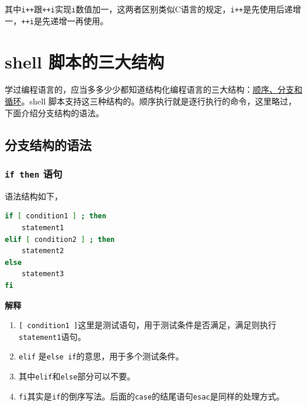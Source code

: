 \documentclass[doctor,openright,twoside]{sjtuthesis}
\providecommand{\tightlist}{%
    \setlength{\itemsep}{0pt}\setlength{\parskip}{0pt}}
\newcommand{\passthrough}[1]{#1}
\theoremstyle{plain}
\theoremstyle{definition}
\theoremstyle{remark}
\theoremstyle{ocrenumbox}
\theoremstyle{plain}
\begin{document}
其中\passthrough{\lstinline!i++!}跟\passthrough{\lstinline!++i!}实现\passthrough{\lstinline!i!}数值加一，这两者区别类似C语言的规定，\passthrough{\lstinline!i++!}是先使用后递增一，\passthrough{\lstinline!++i!}是先递增一再使用。

\hypertarget{shell--4}{%
\section{shell 脚本的三大结构}\label{shell--4}}

学过编程语言的，应当多多少少都知道结构化编程语言的三大结构：\href{https://en.wikipedia.org/wiki/Structured_programming}{顺序、分支和循环}。shell 脚本支持这三种结构的。顺序执行就是逐行执行的命令，这里略过，下面介绍分支结构的语法。

\hypertarget{section-107}{%
\subsection{分支结构的语法}\label{section-107}}

\hypertarget{if-then-}{%
\subsubsection{\texorpdfstring{\texttt{if\ then} 语句}{if then 语句}}\label{if-then-}}

语法结构如下，

\begin{lstlisting}[language=bash]
if [ condition1 ] ; then
    statement1
elif [ condition2 ] ; then
    statement2
else
    statement3
fi
\end{lstlisting}

\textbf{解释}

\begin{enumerate}
\def\labelenumi{\arabic{enumi}.}
\tightlist
\item
  \passthrough{\lstinline![ condition1 ]!}这里是测试语句，用于测试条件是否满足，满足则执行\passthrough{\lstinline!statement1!}语句。
\item
  \passthrough{\lstinline!elif!} 是\passthrough{\lstinline!else if!}的意思，用于多个测试条件。
\item
  其中\passthrough{\lstinline!elif!}和\passthrough{\lstinline!else!}部分可以不要。
\item
  \passthrough{\lstinline!fi!}其实是\passthrough{\lstinline!if!}的倒序写法。后面的\passthrough{\lstinline!case!}的结尾语句\passthrough{\lstinline!esac!}是同样的处理方式。
\end{enumerate}
\end{document}
